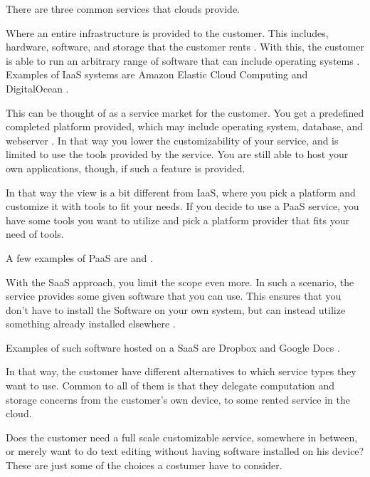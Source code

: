 There are three common services that clouds provide.
\begin{description}[style=nextline]
\item[Infrastructure as a Service (IaaS)]
Where an entire infrastructure is provided to the customer.
This includes, hardware, software, and storage that the customer rents \citep{article:mobilecloudreviewinderkilde}.
With this, the customer is able to run an arbitrary range of software that can include operating systems \citep{misc:indersuverymcc}.
Examples of IaaS systems are Amazon Elastic Cloud Computing \citep{misc:amazonelastic} and DigitalOcean \citep{misc:digitalocean}.

\item[Platform as a Service (PaaS)]
This can be thought of as a service market for the customer.
You get a predefined completed platform provided, which may include operating system, database, and webserver \cite{article:mobilecloudreviewinderkilde}.
In that way you lower the customizability of your service, and is limited to use the tools provided by the service.
You are still able to host your own applications, though, if such a feature is provided.

In that way the view is a bit different from IaaS, where you pick a platform and customize it with tools to fit your needs.
If you decide to use a PaaS service, you have some tools you want to utilize and pick a platform provider that fits your need of tools.

A few examples of PaaS are \citet{misc:appFog} and \citet{misc:heroku}.

\item[Software as a Service (SaaS)]
With the SaaS approach, you limit the scope even more.
In such a scenario, the service provides some given software that you can use.
This ensures that you don't have to install the Software on your own system, but can instead utilize something already installed elsewhere \citep{article:mobilecloudreviewinderkilde,misc:indersuverymcc}. 

Examples of such software hosted on a SaaS are Dropbox and Google Docs \citep{article:mobilecloudreviewinderkildesecurity}. 
\end{description}
In that way, the customer have different alternatives to which service types they want to use.
Common to all of them is that they delegate computation and storage concerns from the customer's own device, to some rented service in the cloud.

Does the customer need a full scale customizable service, somewhere in between, or merely want to do text editing without having software installed on his device?
These are just some of the choices a costumer have to consider.  